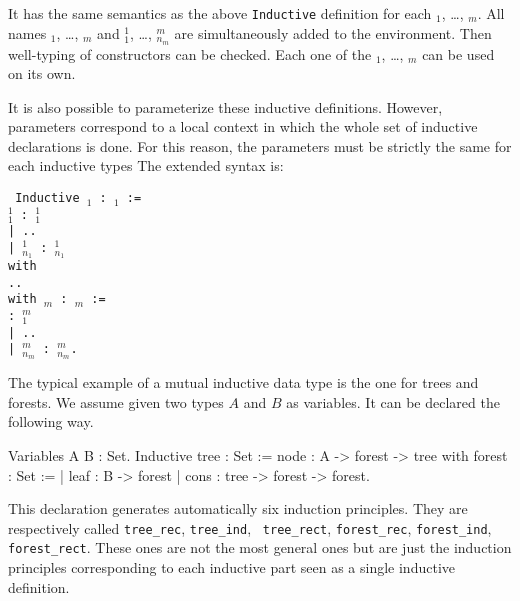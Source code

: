 \noindent It has the same semantics as the above {\tt Inductive}
definition for each \ident$_1$, {\ldots}, \ident$_m$. All names
\ident$_1$, {\ldots}, \ident$_m$ and \ident$_1^1$, \dots,
\ident$_{n_m}^m$ are simultaneously added to the environment. Then
well-typing of constructors can be checked. Each one of the
\ident$_1$, {\ldots}, \ident$_m$ can be used on its own.

It is also possible to parameterize these inductive definitions.
However, parameters correspond to a local
context in which the whole set of inductive declarations is done.  For
this reason, the parameters must be strictly the same for each
inductive types The extended syntax is:

\medskip
{\tt 
Inductive {{\ident$_1$} {\params} : {\type$_1$} :=  \\
\mbox{}\hspace{0.4cm}  {\ident$_1^1$} : {\type$_1^1$} \\
\mbox{}\hspace{0.1cm}| ..  \\
\mbox{}\hspace{0.1cm}| {\ident$_{n_1}^1$} : {\type$_{n_1}^1$}  \\
with\\
\mbox{}\hspace{0.1cm} .. \\
with {\ident$_m$} {\params} : {\type$_m$} := \\
\mbox{}\hspace{0.4cm}{\ident$_1^m$} : {\type$_1^m$} \\
\mbox{}\hspace{0.1cm}| .. \\
\mbox{}\hspace{0.1cm}| {\ident$_{n_m}^m$} : {\type$_{n_m}^m$}.
}}
\medskip

\Example
The typical example of a mutual inductive data type is the one for
trees and forests. We assume given two types $A$ and $B$ as variables.
It can be declared the following way.

\begin{coq_example*}
Variables A B : Set.
Inductive tree : Set :=
    node : A -> forest -> tree
with forest : Set :=
  | leaf : B -> forest
  | cons : tree -> forest -> forest.
\end{coq_example*}

This declaration generates automatically six induction
principles. They are respectively 
called {\tt tree\_rec}, {\tt tree\_ind}, {\tt
  tree\_rect}, {\tt forest\_rec}, {\tt forest\_ind}, {\tt
  forest\_rect}.  These ones are not the most general ones but are
just the induction principles corresponding to each inductive part
seen as a single inductive definition.

